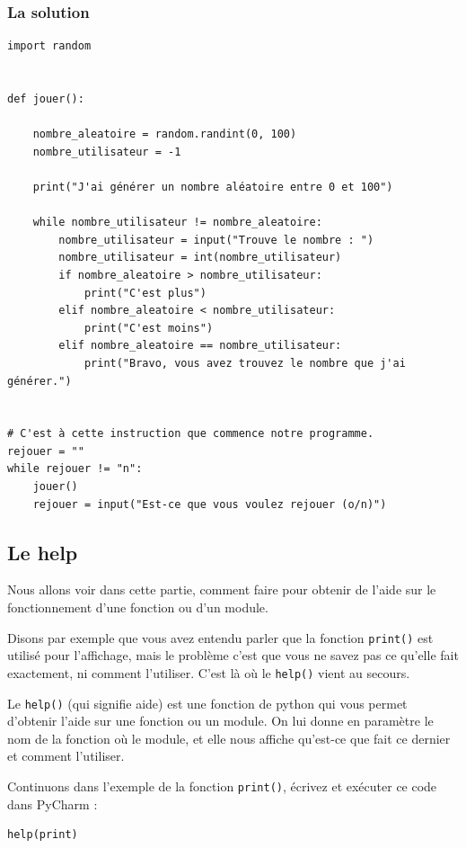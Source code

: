 \documentclass[12pt]{article}
\newcommand{\code}[1]{\colorbox{light-gray}{\texttt{#1}}}
\begin{document}
        \subsubsection{La solution}
        \begin{lstlisting}[style=code, breaklines=false]
import random


def jouer():

    nombre_aleatoire = random.randint(0, 100)
    nombre_utilisateur = -1

    print("J'ai générer un nombre aléatoire entre 0 et 100")

    while nombre_utilisateur != nombre_aleatoire:
        nombre_utilisateur = input("Trouve le nombre : ")
        nombre_utilisateur = int(nombre_utilisateur)
        if nombre_aleatoire > nombre_utilisateur:
            print("C'est plus")
        elif nombre_aleatoire < nombre_utilisateur:
            print("C'est moins")
        elif nombre_aleatoire == nombre_utilisateur:
            print("Bravo, vous avez trouvez le nombre que j'ai générer.")


# C'est à cette instruction que commence notre programme.
rejouer = ""
while rejouer != "n":
    jouer()
    rejouer = input("Est-ce que vous voulez rejouer (o/n)")
        \end{lstlisting}
    \subsection{Le help}
        Nous allons voir dans cette partie, comment faire pour obtenir de l'aide sur le fonctionnement d'une fonction
        ou d'un module.

        Disons par exemple que vous avez entendu parler que la fonction \code{print()} est utilisé pour l'affichage,
        mais le problème c'est que vous ne savez pas ce qu'elle fait exactement, ni comment l'utiliser. C'est là où
        le \code{help()} vient au secours.

        Le \code{help()} (qui signifie aide) est une fonction de python qui vous permet d'obtenir l'aide sur une
        fonction ou un module. On lui donne en paramètre le nom de la fonction où le module, et elle nous affiche
        qu'est-ce que fait ce dernier et comment l'utiliser.

        Continuons dans l'exemple de la fonction \code{print()}, écrivez et exécuter ce code dans PyCharm :
        \begin{lstlisting}[style=code]
help(print)
        \end{lstlisting}
\end{document}
